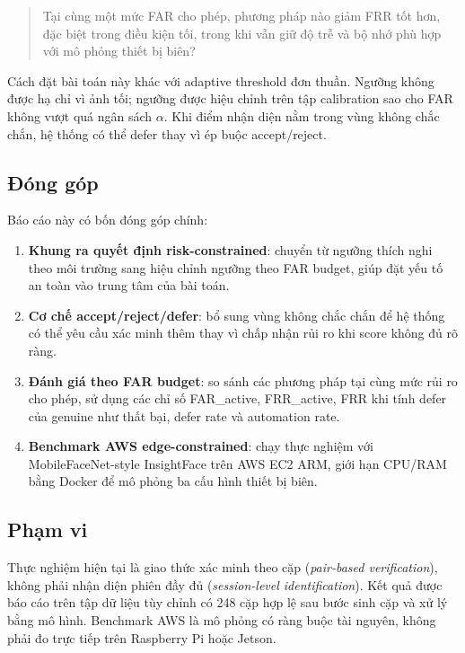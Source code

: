 \begin{quote}
Tại cùng một mức FAR cho phép, phương pháp nào giảm FRR tốt hơn, đặc biệt trong điều kiện tối, trong khi vẫn giữ độ trễ và bộ nhớ phù hợp với mô phỏng thiết bị biên?
\end{quote}

Cách đặt bài toán này khác với adaptive threshold đơn thuần. Ngưỡng không được hạ chỉ vì ảnh tối; ngưỡng được hiệu chỉnh trên tập calibration sao cho FAR không vượt quá ngân sách $\alpha$. Khi điểm nhận diện nằm trong vùng không chắc chắn, hệ thống có thể defer thay vì ép buộc accept/reject.

\subsection{Đóng góp}

Báo cáo này có bốn đóng góp chính:

\begin{enumerate}
    \item \textbf{Khung ra quyết định risk-constrained}: chuyển từ ngưỡng thích nghi theo môi trường sang hiệu chỉnh ngưỡng theo FAR budget, giúp đặt yếu tố an toàn vào trung tâm của bài toán.
    \item \textbf{Cơ chế accept/reject/defer}: bổ sung vùng không chắc chắn để hệ thống có thể yêu cầu xác minh thêm thay vì chấp nhận rủi ro khi score không đủ rõ ràng.
    \item \textbf{Đánh giá theo FAR budget}: so sánh các phương pháp tại cùng mức rủi ro cho phép, sử dụng các chỉ số FAR\_active, FRR\_active, FRR khi tính defer của genuine như thất bại, defer rate và automation rate.
    \item \textbf{Benchmark AWS edge-constrained}: chạy thực nghiệm với MobileFaceNet-style InsightFace trên AWS EC2 ARM, giới hạn CPU/RAM bằng Docker để mô phỏng ba cấu hình thiết bị biên.
\end{enumerate}

\subsection{Phạm vi}

Thực nghiệm hiện tại là giao thức xác minh theo cặp (\textit{pair-based verification}), không phải nhận diện phiên đầy đủ (\textit{session-level identification}). Kết quả được báo cáo trên tập dữ liệu tùy chỉnh có 248 cặp hợp lệ sau bước sinh cặp và xử lý bằng mô hình. Benchmark AWS là mô phỏng có ràng buộc tài nguyên, không phải đo trực tiếp trên Raspberry Pi hoặc Jetson.
